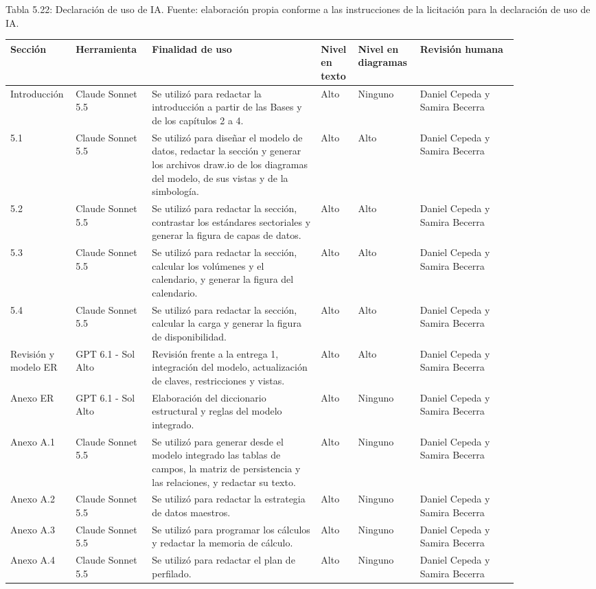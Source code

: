 \documentclass[11pt]{article}
\begin{document}
\par\vspace{0.6\baselineskip}\noindent\begin{minipage}{\linewidth}
Tabla 5.22: Declaración de uso de IA. Fuente: elaboración propia conforme a las instrucciones de la licitación para la declaración de uso de IA.\label{tab:ia}\par\vspace{0.3\baselineskip}
\begin{tabular}{@{}p{0.070\linewidth}p{0.140\linewidth}p{0.310\linewidth}p{0.065\linewidth}p{0.090\linewidth}p{0.180\linewidth}@{}}
\toprule Sección & Herramienta & Finalidad de uso & Nivel en texto & Nivel en diagramas & Revisión humana \\
\midrule
Introducción & Claude Sonnet 5.5 & Se utilizó para redactar la introducción a partir de las Bases y de los capítulos 2 a 4. & Alto & Ninguno & Daniel Cepeda y Samira Becerra \\
5.1 & Claude Sonnet 5.5 & Se utilizó para diseñar el modelo de datos, redactar la sección y generar los archivos draw.io de los diagramas del modelo, de sus vistas y de la simbología. & Alto & Alto & Daniel Cepeda y Samira Becerra \\
5.2 & Claude Sonnet 5.5 & Se utilizó para redactar la sección, contrastar los estándares sectoriales y generar la figura de capas de datos. & Alto & Alto & Daniel Cepeda y Samira Becerra \\
5.3 & Claude Sonnet 5.5 & Se utilizó para redactar la sección, calcular los volúmenes y el calendario, y generar la figura del calendario. & Alto & Alto & Daniel Cepeda y Samira Becerra \\
5.4 & Claude Sonnet 5.5 & Se utilizó para redactar la sección, calcular la carga y generar la figura de disponibilidad. & Alto & Alto & Daniel Cepeda y Samira Becerra \\
Revisión y modelo ER & GPT 6.1 - Sol Alto & Revisión frente a la entrega 1, integración del modelo, actualización de claves, restricciones y vistas. & Alto & Alto & Daniel Cepeda y Samira Becerra \\
Anexo ER & GPT 6.1 - Sol Alto & Elaboración del diccionario estructural y reglas del modelo integrado. & Alto & Ninguno & Daniel Cepeda y Samira Becerra \\
Anexo A.1 & Claude Sonnet 5.5 & Se utilizó para generar desde el modelo integrado las tablas de campos, la matriz de persistencia y las relaciones, y redactar su texto. & Alto & Ninguno & Daniel Cepeda y Samira Becerra \\
Anexo A.2 & Claude Sonnet 5.5 & Se utilizó para redactar la estrategia de datos maestros. & Alto & Ninguno & Daniel Cepeda y Samira Becerra \\
Anexo A.3 & Claude Sonnet 5.5 & Se utilizó para programar los cálculos y redactar la memoria de cálculo. & Alto & Ninguno & Daniel Cepeda y Samira Becerra \\
Anexo A.4 & Claude Sonnet 5.5 & Se utilizó para redactar el plan de perfilado. & Alto & Ninguno & Daniel Cepeda y Samira Becerra \\
\bottomrule
\end{tabular}
\end{minipage}
\end{document}
